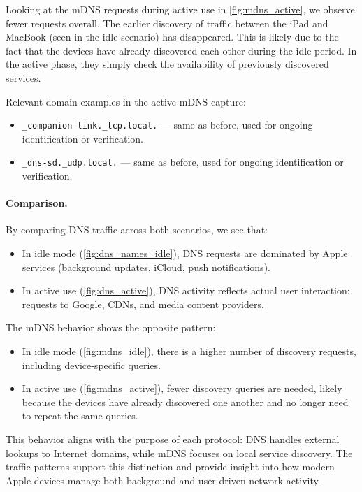 \documentclass[sigconf,nonacm]{acmart}
\begin{document}
Looking at the mDNS requests during active use in \cref{fig:mdns_active}, we observe fewer requests overall. The earlier discovery of traffic between the iPad and MacBook (seen in the idle scenario) has disappeared. This is likely due to the fact that the devices have already discovered each other during the idle period. In the active phase, they simply check the availability of previously discovered services.

Relevant domain examples in the active mDNS capture:

\begin{itemize}
    \item \texttt{\_companion-link.\_tcp.local.} — same as before, used for ongoing identification or verification.
    \item \texttt{\_dns-sd.\_udp.local.} — same as before, used for ongoing identification or verification.
\end{itemize}

\paragraph{Comparison.}

By comparing DNS traffic across both scenarios, we see that:

\begin{itemize}
    \item In idle mode (\cref{fig:dns_names_idle}), DNS requests are dominated by Apple services (background updates, iCloud, push notifications).
    \item In active use (\cref{fig:dns_active}), DNS activity reflects actual user interaction: requests to Google, CDNs, and media content providers.
\end{itemize}

The mDNS behavior shows the opposite pattern:

\begin{itemize}
    \item In idle mode (\cref{fig:mdns_idle}), there is a higher number of discovery requests, including device-specific queries.
    \item In active use (\cref{fig:mdns_active}), fewer discovery queries are needed, likely because the devices have already discovered one another and no longer need to repeat the same queries.
\end{itemize}

This behavior aligns with the purpose of each protocol: DNS handles external lookups to Internet domains, while mDNS focuses on local service discovery. The traffic patterns support this distinction and provide insight into how modern Apple devices manage both background and user-driven network activity.
\end{document}
